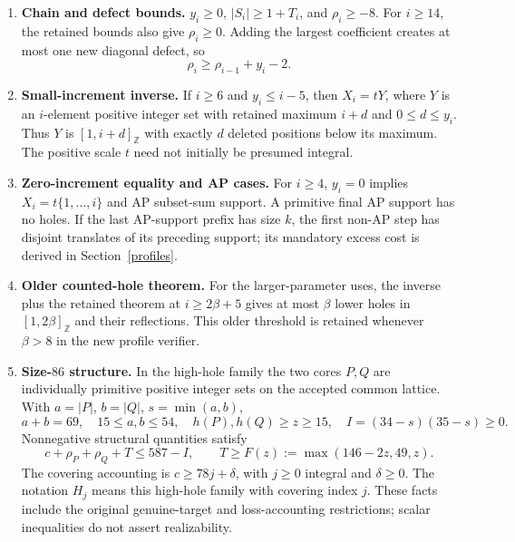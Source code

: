 \documentclass[11pt,a4paper]{article}
\newcommand{\Z}{\mathbb Z}
\newcommand{\ints}[2]{[#1,#2]_{\Z}}
\begin{document}
\begin{enumerate}[label=\textbf{P\arabic*.}]
\item \textbf{Chain and defect bounds.} $y_i\ge0$, $|S_i|\ge1+T_i$, and $\rho_i\ge-8$. For $i\ge14$, the retained bounds also give $\rho_i\ge0$. Adding the largest coefficient creates at most one new diagonal defect, so
\begin{equation}\rho_i\ge\rho_{i-1}+y_i-2.\label{recurrence}\end{equation}
\item \textbf{Small-increment inverse.} If $i\ge6$ and $y_i\le i-5$, then $X_i=tY$, where $Y$ is an $i$-element positive integer set with retained maximum $i+d$ and $0\le d\le y_i$. Thus $Y$ is $\ints1{i+d}$ with exactly $d$ deleted positions below its maximum. The positive scale $t$ need not initially be presumed integral.
\item \textbf{Zero-increment equality and AP cases.} For $i\ge4$, $y_i=0$ implies $X_i=t\{1,\ldots,i\}$ and AP subset-sum support. A primitive final AP support has no holes. If the last AP-support prefix has size $k$, the first non-AP step has disjoint translates of its preceding support; its mandatory excess cost is derived in Section~\ref{profiles}.
\item \textbf{Older counted-hole theorem.} For the larger-parameter uses, the inverse plus the retained theorem at $i\ge2\beta+5$ gives at most $\beta$ lower holes in $\ints1{2\beta}$ and their reflections. This older threshold is retained whenever $\beta>8$ in the new profile verifier.
\item \textbf{Size-$86$ structure.} In the high-hole family the two cores $P,Q$ are individually primitive positive integer sets on the accepted common lattice. With $a=|P|$, $b=|Q|$, $s=\min(a,b)$,
\[
a+b=69,\quad15\le a,b\le54,\quad h(P),h(Q)\ge z\ge15,
\quad I=(34-s)(35-s)\ge0.
\]
Nonnegative structural quantities satisfy
\begin{equation}
c+\rho_P+\rho_Q+T\le587-I,\qquad
T\ge F(z):=\max(146-2z,49,z).\label{budget}
\end{equation}
The covering accounting is $c\ge78j+\delta$, with $j\ge0$ integral and $\delta\ge0$. The notation $H_j$ means this high-hole family with covering index $j$. These facts include the original genuine-target and loss-accounting restrictions; scalar inequalities do not assert realizability.
\end{enumerate}

\newpage
\end{document}
